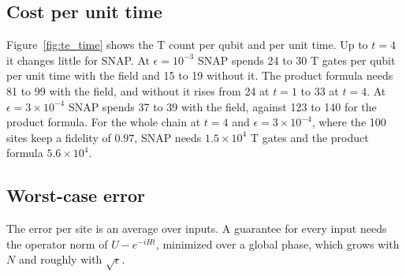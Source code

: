 
\subsection{Cost per unit time}
\label{sec:time_evolution_perunit}

Figure~\ref{fig:te_time} shows the T count per qubit and per unit time. Up to $t = 4$ it changes little for SNAP. At $\epsilon = 10^{-3}$ SNAP spends 24 to 30 T gates per qubit per unit time with the field and 15 to 19 without it. The product formula needs 81 to 99 with the field, and without it rises from 24 at $t = 1$ to 33 at $t = 4$. At $\epsilon = 3 \times 10^{-4}$ SNAP spends 37 to 39 with the field, against 123 to 140 for the product formula. For the whole chain at $t = 4$ and $\epsilon = 3 \times 10^{-4}$, where the 100 sites keep a fidelity of $0.97$, SNAP needs $1.5 \times 10^{4}$ T gates and the product formula $5.6 \times 10^{4}$. 

\subsection{Worst-case error}
\label{sec:time_evolution_opnorm}

The error per site is an average over inputs. A guarantee for every input needs the operator norm of $U - e^{-iHt}$, minimized over a global phase, which grows with $N$ and roughly with $\sqrt{\epsilon}$. 
